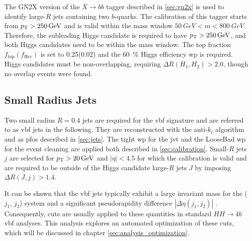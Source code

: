 The GN2X version of the $X\rightarrow bb$ tagger described in \ref{sec:gn2x} is used to identify large-$R$ jets containing two $b$-quarks. The calibration of this tagger starts from $p_{\text{T}}>\qty[]{250}{GeV}$ and is valid within the mass window $\qty[]{50}{GeV}<m<\qty[]{800}{GeV}$. Therefore, the subleading Higgs candidate is required to have $p_{\text{T}}>\qty[]{250}{GeV}$, and both Higgs candidates need to be within the mass window. The top fraction $f_\text{top}(f_\text{Hcc})$ is set to 0.25(0.02) and the \qty[]{60}{\percent} Higgs efficiency \ac{wp} is required. Higgs candidates must be non-overlapping, requiring $\Delta R(H_1, H_2) > 2.0$, though no overlap events were found.

\subsection{Small Radius Jets}
Two small radius $R=0.4$ jets are required for the \ac{vbf} signature and are referred to as \ac{vbf} jets in the following. They are reconstructed with the anti-$k_t$ algorithm and as \acp{pfo} described in \ref{sec:jets}. The tight \ac{wp} for the \ac{jvt} and the LooseBad \ac{wp} for the event cleaning are applied both described in \ref{sec:calibration}. Small-$R$ jets $j$ are selected for $p_{\text{T}}>\qty[]{20}{GeV}$ and $|\eta|<4.5$ for which the calibration is valid and are required to be outside of the Higgs candidate large-$R$ jets $J$ by imposing $\Delta R(J,j) > 1.4$.

It can be shown that the \ac{vbf} jets typically exhibit a large invariant mass for the ($j_1$, $j_2$) system and a significant pseudorapidity difference $|\Delta\eta(j_1,j_2)|$ \citep{rauch2016vectorboson}. Consequently, cuts are usually applied to these quantities in standard $HH\rightarrow 4b$ \ac{vbf} analyses. This analysis explores an automated optimization of these cuts, which will be discussed in chapter \ref{sec:analysis_optimization}.

